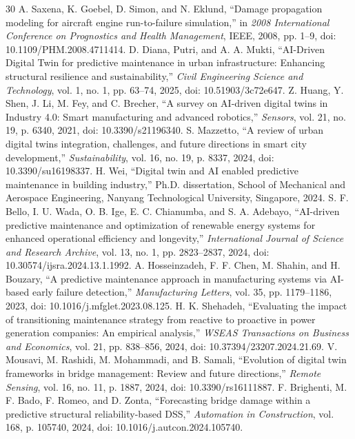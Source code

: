 \documentclass[12pt,a4paper]{article}
\begin{document}
\begin{thebibliography}{30}
 A. Saxena, K. Goebel, D. Simon, and N. Eklund, ``Damage propagation modeling for aircraft engine run-to-failure simulation,'' in \textit{2008 International Conference on Prognostics and Health Management}, IEEE, 2008, pp. 1--9, doi: 10.1109/PHM.2008.4711414.
 D. Diana, Putri, and A. A. Mukti, ``AI-Driven Digital Twin for predictive maintenance in urban infrastructure: Enhancing structural resilience and sustainability,'' \textit{Civil Engineering Science and Technology}, vol. 1, no. 1, pp. 63--74, 2025, doi: 10.51903/3c72e647.
 Z. Huang, Y. Shen, J. Li, M. Fey, and C. Brecher, ``A survey on AI-driven digital twins in Industry 4.0: Smart manufacturing and advanced robotics,'' \textit{Sensors}, vol. 21, no. 19, p. 6340, 2021, doi: 10.3390/s21196340.
 S. Mazzetto, ``A review of urban digital twins integration, challenges, and future directions in smart city development,'' \textit{Sustainability}, vol. 16, no. 19, p. 8337, 2024, doi: 10.3390/su16198337.
 H. Wei, ``Digital twin and AI enabled predictive maintenance in building industry,'' Ph.D. dissertation, School of Mechanical and Aerospace Engineering, Nanyang Technological University, Singapore, 2024.
 S. F. Bello, I. U. Wada, O. B. Ige, E. C. Chianumba, and S. A. Adebayo, ``AI-driven predictive maintenance and optimization of renewable energy systems for enhanced operational efficiency and longevity,'' \textit{International Journal of Science and Research Archive}, vol. 13, no. 1, pp. 2823--2837, 2024, doi: 10.30574/ijsra.2024.13.1.1992.
 A. Hosseinzadeh, F. F. Chen, M. Shahin, and H. Bouzary, ``A predictive maintenance approach in manufacturing systems via AI-based early failure detection,'' \textit{Manufacturing Letters}, vol. 35, pp. 1179--1186, 2023, doi: 10.1016/j.mfglet.2023.08.125.
 H. K. Shehadeh, ``Evaluating the impact of transitioning maintenance strategy from reactive to proactive in power generation companies: An empirical analysis,'' \textit{WSEAS Transactions on Business and Economics}, vol. 21, pp. 838--856, 2024, doi: 10.37394/23207.2024.21.69.
 V. Mousavi, M. Rashidi, M. Mohammadi, and B. Samali, ``Evolution of digital twin frameworks in bridge management: Review and future directions,'' \textit{Remote Sensing}, vol. 16, no. 11, p. 1887, 2024, doi: 10.3390/rs16111887.
 F. Brighenti, M. F. Bado, F. Romeo, and D. Zonta, ``Forecasting bridge damage within a predictive structural reliability-based DSS,'' \textit{Automation in Construction}, vol. 168, p. 105740, 2024, doi: 10.1016/j.autcon.2024.105740.

\end{thebibliography}
\end{document}
